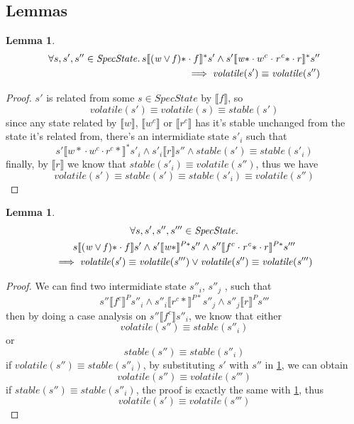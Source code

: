 \documentclass[a4paper,11pt]{article}
\newtheorem{lemma}[theorem]{Lemma}
\theoremstyle{definition}
\begin{document}
\subsection{Lemmas}

\begin{lemma}\label{lemma-2-1}
\begin{align*}
	\forall s, s', s'' \in \mathit{SpecState} \ldotp s \llbracket \mathit{(w \lor f)\ast} \cdot f \rrbracket^* s' \land s' \llbracket \mathit{w\ast} \cdot w^c \cdot \mathit{r^c\ast} \cdot r \rrbracket^* s'' \\
	  \implies \mathit{volatile(s')} \equiv \mathit{volatile(s'')}
\end{align*}
\end{lemma}
\begin{proof}
	$s'$ is related from some $s \in \mathit{SpecState}$ by $\llbracket f \rrbracket$, so
		$$\mathit{volatile(s')} \equiv \mathit{volatile(s)} \equiv \mathit{stable(s')}$$
	since any state related by $\llbracket w \rrbracket$, $\llbracket w^c \rrbracket$ or $\llbracket r^c \rrbracket$ has it's stable unchanged from the state it's related from, there's an intermidiate state $s'_i$ such that
		$$s' \llbracket {w*} \cdot w^c \cdot {r^c *} \rrbracket^* s'_i \land s'_i \llbracket r \rrbracket s'' \land stable(s') \equiv stable(s'_i)$$
	finally, by $\llbracket r \rrbracket$ we know that $\mathit{stable(s'_i) \equiv volatile(s'')}$, thus we have
		$$\mathit{volatile(s') \equiv stable(s') \equiv stable(s'_i) \equiv volatile(s'')}$$
\end{proof}

\begin{lemma}\label{lemma-2-2}
\begin{multline*}
      \forall s, s', s'', s''' \in \mathit{SpecState} \ldotp \\
      s \llbracket \mathit{(w \lor f)\ast} \cdot f \rrbracket s' \land
	  s' \llbracket \mathit{w\ast} \rrbracket^{P*} s'' \land
	  s'' \llbracket f^c \cdot \mathit{r^c\ast} \cdot r \rrbracket^{P*} s'''\\ \implies \mathit{volatile(s')} \equiv \mathit{volatile(s''')} \lor \mathit{volatile(s'')} \equiv \mathit{volatile(s''')}
\end{multline*}
\end{lemma}
\begin{proof}
	We can find two intermidiate state $s''_i$, $s''_j$ , such that $$s'' \llbracket f^c \rrbracket^P s''_i \land s''_i \llbracket r^c* \rrbracket^{P*} s''_j \land s''_j \llbracket r \rrbracket^P s'''$$
	then by doing a case analysis on $s'' \llbracket f^c \rrbracket s''_i$, we know that either $$\mathit{volatile(s'') \equiv stable(s''_i)}$$ or $$\mathit{stable(s'') \equiv stable(s''_i)}$$
	if $\mathit{volatile(s'') \equiv stable(s''_i)}$, by substituting $s'$ with $s''$ in
	\cref{lemma-2-1}, we can obtain $$\mathit{volatile(s'') \equiv volatile(s''')}$$
	if $\mathit{stable(s'') \equiv stable(s''_i)}$, the proof is exactly the same with \cref{lemma-2-1}, thus $$\mathit{volatile(s') \equiv volatile(s''')}$$
\end{proof}
\end{document}
